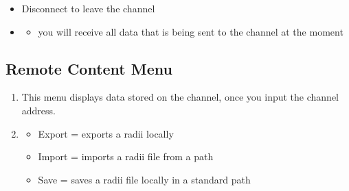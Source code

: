 \documentclass[letterpaper,10pt,english]{sphinxmanual}
\begin{document}
\begin{enumerate}
\begin{itemize}
\item {} 
\sphinxAtStartPar
Disconnect to leave the channel

\item {} \begin{description}
\begin{itemize}
\item {} 
\sphinxAtStartPar
you will receive all data that is being sent to the channel at the moment

\end{itemize}

\end{description}

\end{itemize}

\end{enumerate}

\sphinxstepscope


\subsection{Remote Content Menu}
\label{\detokenize{tutorial/Viewer_PC/documentation_rst/2_Remote_content:remote-content-menu}}\label{\detokenize{tutorial/Viewer_PC/documentation_rst/2_Remote_content::doc}}
\noindent{}
\begin{enumerate}
%
\setcounter{enumi}{5}
\item {} 
\sphinxAtStartPar
This menu displays data stored on the channel, once you input the channel address.

\item {} \begin{description}
\begin{itemize}
\item {} 
\sphinxAtStartPar
Export = exports a radii locally

\item {} 
\sphinxAtStartPar
Import = imports a radii file from a path

\item {} 
\sphinxAtStartPar
Save = saves a radii file locally in a standard path

\end{itemize}

\end{description}

\end{enumerate}
\end{document}
